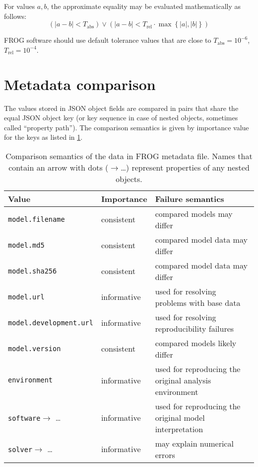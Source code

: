 For values $a, b$, the approximate equality may be evaluated mathematically as follows:
\[\left(|a-b|<T_{\text{abs}}\right) \lor \left(|a-b|<T_{\text{rel}}\cdot \max\left\{|a|, |b|\right\}\right) \]

FROG software should use default tolerance values that are close to $T_\text{abs}=10^{-6}$, $T_\text{rel}=10^{-4}$.

\section{Metadata comparison}

The values stored in JSON object fields are compared in pairs that share the equal JSON object key (or key sequence in case of nested objects, sometimes called ``property path''). The comparison semantics is given by importance value for the keys as listed in \cref{tab:cmpmeta}.

\begin{table}\tablefont
\begin{tabular}{llp{30em}}
\toprule
Value & Importance & Failure semantics \\
\midrule
\verb|model.filename|
 & consistent
 & compared models may differ
 \\
\verb|model.md5|
 & consistent
 & compared model data may differ
 \\
\verb|model.sha256|
 & consistent
 & compared model data may differ
 \\
\verb|model.url|
 & informative
 & used for resolving problems with base data
 \\
\verb|model.development.url|
 & informative
 & used for resolving reproducibility failures
 \\
\verb|model.version|
 & consistent
 & compared models likely differ
 \\
\verb|environment|
 & informative
 & used for reproducing the original analysis environment
 \\
\verb|software|$\to$ \dots
 & informative
 & used for reproducing the original model interpretation
 \\
\verb|solver|$\to$ \dots
 & informative
 & may explain numerical errors
 \\
\bottomrule
\end{tabular}
\caption[Comparison semantics of FROG metadata file.]{Comparison semantics of the data in FROG metadata file. Names that contain an arrow with dots ($\to$\dots) represent properties of any nested objects.}
\label{tab:cmpmeta}
\end{table}

